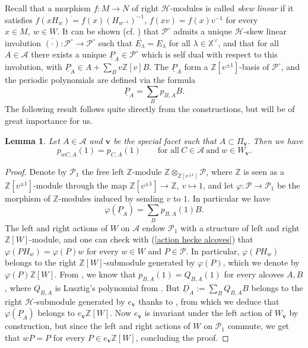 \documentclass[11pt]{amsart}
\theoremstyle{plain}
\newtheorem{lem}[thm]{Lemma}
\theoremstyle{remark}
\numberwithin{equation}{section}
\begin{document}
	Recall that a morphism $f:M\to N$ of right $\mathcal{H}$-modules is called \textit{skew linear} if it satisfies $f(xH_w)=f(x)(H_{w^{-1}})^{-1}$, $f(xv)=f(x)v^{-1}$  for every $x\in M,~w\in W$. It can be shown (cf. \cite[Theorem 4.3]{Soergel1997KazhdanLusztigPA}) that $\mathcal{P}^\circ$ admits a unique $\mathcal{H}$-skew linear involution $\overline{(\cdot)}:\mathcal{P}^\circ\to \mathcal{P}^\circ$ such that $\overline{E_\lambda}=E_\lambda$ for all $\lambda\in\mathbb{X}^\vee$, and that for all $A\in \mathcal{A}$ there exists a unique $\underline{P}_A\in\mathcal{P}^\circ$ which is self dual with respect to this involution, with $\underline{P}_A\in A+\sum_Bv\mathbb{Z}[v]B$. The $\underline{P}_A$ form a $\mathbb{Z}[v^{\pm1}]$-basis of $\mathcal{P}^\circ$, and the periodic polynomials are defined via the formula
	$$\underline{P}_A=\sum_B p_{B,A}B.$$
	The following result follows quite directly from the constructions, but will be of great importance for us.
	\begin{lem}\label{lem inv}
		Let $A\in\mathcal{A}$ and $\mathbf{v}$ be the special facet such that $A\subset\Pi_\mathbf{v}$. Then we have 
		$$p_{wC,A}(1)=p_{C,A}(1)\qquad \text{for all}~C\in\mathcal{A}~\text{and}~w\in W_\mathbf{v}. $$
	\end{lem}
	\begin{proof}
		Denote by $\mathcal{P}_1$ the free left $\mathbb{Z}$-module $\mathbb{Z}\otimes_{\mathbb{Z}[v^{\pm1}]}\mathcal{P}$, where $\mathbb{Z}$ is seen as a  $\mathbb{Z}[v^{\pm1}]$-module through the map $\mathbb{Z}[v^{\pm1}]\to \mathbb{Z},~v\mapsto 1$, and let $\varphi:\mathcal{P}\to \mathcal{P}_1$ be the morphism of $\mathbb{Z}$-modules induced by sending $v$ to $1$. In particular we have
		$$\varphi(\underline{P}_A)=\sum_{B}p_{B,A}(1)B. $$
		The left and right actions of $W$ on $\mathcal{A}$ endow $\mathcal{P}_1$ with a structure of left and right $\mathbb{Z}[W]$-module, and one can check with (\ref{action hecke alcoves}) that $\varphi(PH_w)=\varphi(P)w$ for every $w\in W$ and $P\in\mathcal{P}$. In particular, $\varphi(PH_w)$ belongs to the right $\mathbb{Z}[W]$-submodule generated by $\varphi(P)$, which we denote by $\varphi(P)\mathbb{Z}[W]$. From \cite[Remark 4.4]{Soergel1997KazhdanLusztigPA}, we know that $p_{B,A}(1)=Q_{B,A}(1)$ for every alcoves $A,B$, where $Q_{B,A}$ is Lusztig's polynomial from \cite{LUSZTIG1980121}. But $\underline{D}_A:=\sum_{B}Q_{B,A}B$ belongs to the right $\mathcal{H}$-submodule generated by $e_\mathbf{v}$ thanks to \cite[Theorem 2.15]{LUSZTIG1980121}, from which we deduce that $\varphi(\underline{P}_A)$ belongs to $e_\mathbf{v}\mathbb{Z}[W]$. Now $e_\mathbf{v}$ is invariant under the left action of $W_\mathbf{v}$ by construction, but since the left and right actions of $W$ on $\mathcal{P}_1$ commute, we get that $wP=P$ for every $P\in e_\mathbf{v}\mathbb{Z}[W]$, concluding the proof.
	\end{proof}
\end{document}

